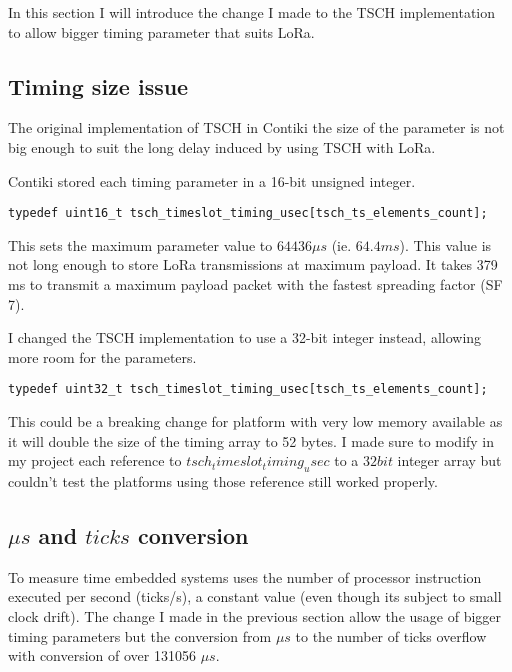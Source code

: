 In this section I will introduce the change I made to the TSCH implementation
to allow bigger timing parameter that suits LoRa.

\subsection{Timing size issue}

The original implementation of TSCH in Contiki the size of the parameter
is not big enough to suit the long delay induced by using TSCH with LoRa.

Contiki stored each timing parameter in a 16-bit unsigned integer.

\begin{lstlisting}
typedef uint16_t tsch_timeslot_timing_usec[tsch_ts_elements_count];
\end{lstlisting}

This sets the maximum parameter value to $64436\mu s$ (ie. $64.4 ms$).
This value is not long enough to store LoRa transmissions at maximum payload.
It takes 379 ms to transmit a maximum payload packet with the fastest spreading
factor (SF 7).

I changed the TSCH implementation to use a 32-bit integer instead, allowing more
room for the parameters.

\begin{lstlisting}
typedef uint32_t tsch_timeslot_timing_usec[tsch_ts_elements_count];
\end{lstlisting}

This could be a breaking change for platform with very low memory available as
it will double the size of the timing array to 52 bytes.
I made sure to modify in my project each reference to
$tsch_timeslot_timing_usec$ to a $32 bit$ integer array but couldn't test the
platforms using those reference still worked properly.

\subsection{$\mu s$ and $ticks$ conversion}

To measure time embedded systems uses the number of processor instruction executed
per second (ticks/s), a constant value (even though its subject to small clock drift).
The change I made in the previous section allow the usage of bigger timing
parameters but the conversion from $\mu s$ to the number of ticks overflow
with conversion of over 131056 $\mu s$.

\paragraph{}

